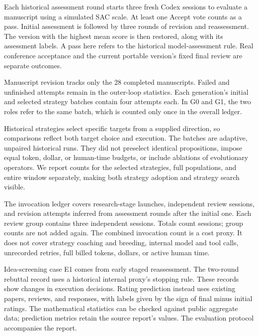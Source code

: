 Each historical assessment round starts three fresh Codex sessions to evaluate a manuscript using a simulated SAC scale. At least one Accept vote counts as a pass. Initial assessment is followed by three rounds of revision and reassessment. The version with the highest mean score is then restored, along with its assessment labels. A pass here refers to the historical model-assessment rule. Real conference acceptance and the current portable version's fixed final review are separate outcomes.

Manuscript revision tracks only the 28 completed manuscripts. Failed and unfinished attempts remain in the outer-loop statistics. Each generation's initial and selected strategy batches contain four attempts each. In G0 and G1, the two roles refer to the same batch, which is counted only once in the overall ledger.

Historical strategies select specific targets from a supplied direction, so comparisons reflect both target choice and execution. The batches are adaptive, unpaired historical runs. They did not preselect identical propositions, impose equal token, dollar, or human-time budgets, or include ablations of evolutionary operators. We report counts for the selected strategies, full populations, and entire window separately, making both strategy adoption and strategy search visible.

The invocation ledger covers research-stage launches, independent review sessions, and revision attempts inferred from assessment rounds after the initial one. Each review group contains three independent sessions. Totals count sessions; group counts are not added again. The combined invocation count is a cost proxy. It does not cover strategy coaching and breeding, internal model and tool calls, unrecorded retries, full billed tokens, dollars, or active human time.

Idea-screening case E1 comes from early staged reassessment. The two-round rebuttal record uses a historical internal proxy's stopping rule. These records show changes in execution decisions. Rating prediction instead uses existing papers, reviews, and responses, with labels given by the sign of final minus initial ratings. The mathematical statistics can be checked against public aggregate data; prediction metrics retain the source report's values. The evaluation protocol accompanies the report.

